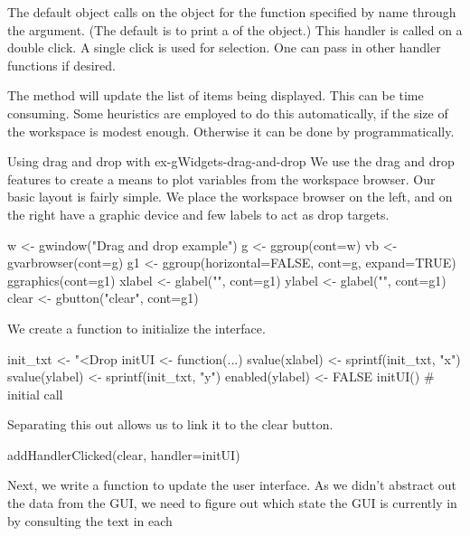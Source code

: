 The default  object calls
 on the object for the function specified by name
through the  argument. (The default is
to print a  of the object.) This handler is called on a
double click. A single click is used for selection. One can pass in
other handler functions if desired.  


The  method will update the list of items
being displayed.  This can be time consuming. Some heuristics
are employed to do this automatically, if the size of the workspace is
modest enough. Otherwise it can be done by programmatically.

\begin{example}{Using drag and drop with }{ex-gWidgets-drag-and-drop}
  We use the drag and drop features to create a means to plot
  variables from the workspace browser.  Our basic layout is fairly
  simple. We place the workspace browser on the left, and on the right
  have a graphic device and few labels to act as drop targets.
\begin{Schunk}
\begin{Sinput}
 w <- gwindow("Drag and drop example")
 g <- ggroup(cont=w)
 vb <- gvarbrowser(cont=g)
 g1 <- ggroup(horizontal=FALSE, cont=g, expand=TRUE)
 ggraphics(cont=g1)
 xlabel <- glabel("", cont=g1)
 ylabel <- glabel("", cont=g1)
 clear <- gbutton("clear", cont=g1)
\end{Sinput}
\end{Schunk}
%
We create a function to initialize the interface.
\begin{Schunk}
\begin{Sinput}
 init_txt <- "<Drop %
 initUI <- function(...) {
   svalue(xlabel) <- sprintf(init_txt, "x")
   svalue(ylabel) <- sprintf(init_txt, "y")
   enabled(ylabel) <- FALSE
 }
 initUI()                                # initial call
\end{Sinput}
\end{Schunk}
%
Separating this out allows us to link it to the clear button.
\begin{Schunk}
\begin{Sinput}
 addHandlerClicked(clear, handler=initUI)
\end{Sinput}
\end{Schunk}
%
Next, we write a function to update the user interface. As we didn't
abstract out the data from the GUI, we need to figure out which state
the GUI is currently in by consulting the text in each

\end{example}
